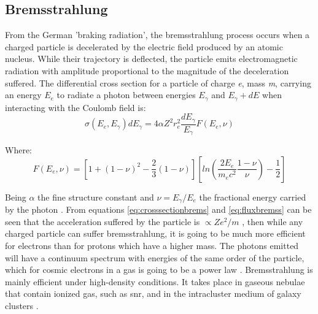 \documentclass[main.tex]{subfiles}
\begin{document}
\subsection{Bremsstrahlung}

From the German 'braking radiation', the bremsstrahlung process occurs when a charged particle is decelerated by the electric field produced by an atomic nucleus. While their trajectory is deflected, the particle emits electromagnetic radiation with amplitude proportional to the magnitude of the deceleration suffered. The differential cross section for a particle of charge \textit{e}, mass \textit{m}, carrying an energy $E_{e}$ to radiate a photon between energies $E_{\gamma}$ and $E_{\gamma}+dE$ when interacting with the Coulomb field is:
\begin{equation} \label{eq:crosssectionbrems}
    \sigma(E_{e},E_{\gamma})dE_{\gamma} = 4\alpha Z^2r^{2}_{e}\frac{dE_{\gamma}}{E_{\gamma}}F(E_{e}, \nu)
\end{equation}

Where:
\begin{equation} \label{eq:fluxbremss}
    F(E_{e},\nu) = [1+(1-\nu)^2-\frac{2}{3}(1-\nu)]\left[ ln \left( \frac{2E_{e}}{m_{e}c^2} \frac{1-\nu}{\nu}\right)-\frac{1}{2}\right]
\end{equation}

Being $\alpha$ the fine structure constant and $\nu = E_{\gamma}/E_e$ the fractional energy carried by the photon \cite{1993MurthyGammaRay}. From equations \ref{eq:crosssectionbrems} and \ref{eq:fluxbremss} can be seen that the acceleration suffered by the particle is $\propto Ze^2/m$ , then while any charged particle can suffer bremsstrahlung, it is going to be much more efficient for electrons  than for protons which have a higher mass.
The photons emitted will have a continuum spectrum with energies of the same order of the particle, which for cosmic electrons in a gas is going to be a power law \cite{weekes2003HEAstrophy}. Bremsstrahlung is mainly efficient under high-density conditions. It takes place in gaseous nebulae that contain ionized gas, such as \gls{snr}, and in the intracluster medium of galaxy clusters \cite{MaozNushellAstro}. 
\end{document}
